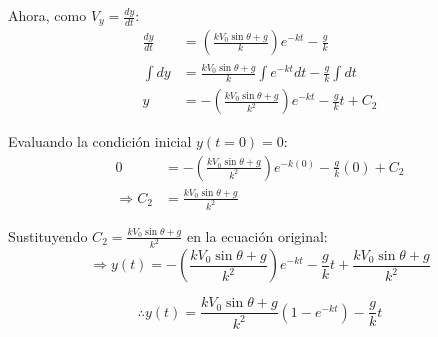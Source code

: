 \vspace{5 mm}
Ahora, como $V_{y} = \frac{dy}{dt}$:
\begin{align*}
    \frac{dy}{dt} &= \left (\frac{kV_{0}\sin\theta+g}{k} \right)e^{-kt} - \frac{g}{k}\\
    \int dy &= \frac{kV_{0}\sin\theta+g}{k} \int e^{-kt}dt - \frac{g}{k} \int dt\\
    y &= -\left (\frac{kV_{0}\sin\theta+g}{k^2} \right)e^{-kt} - \frac{g}{k}t + C_{2}
\end{align*}

\vspace{5 mm}
Evaluando la condición inicial $y(t=0) = 0$:
\begin{align*}
    0 &= -\left (\frac{kV_{0}\sin\theta+g}{k^2} \right)e^{-k(0)} - \frac{g}{k}(0) + C_{2}\\
    \Rightarrow C_{2} &= \frac{kV_{0}\sin\theta+g}{k^2}
\end{align*}

\vspace{5 mm}
Sustituyendo $C_{2} = \frac{kV_{0}\sin\theta+g}{k^2}$ en la ecuación original:
\begin{equation*}
    \Rightarrow y(t) = -\left (\frac{kV_{0}\sin\theta+g}{k^2} \right)e^{-kt} - \frac{g}{k}t + \frac{kV_{0}\sin\theta+g}{k^2}
\end{equation*}

\vspace{5 mm}
\begin{equation*}
    \therefore y(t) = \frac{kV_{0}\sin\theta+g}{k^2} (1-e^{-kt}) - \frac{g}{k}t
\end{equation*}